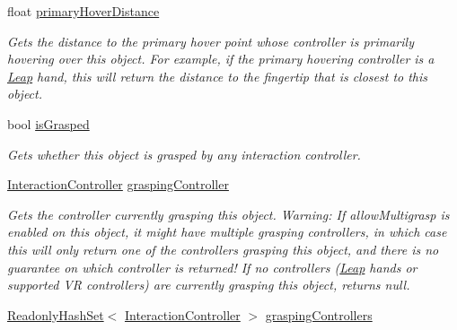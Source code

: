 \begin{DoxyCompactItemize}
float \mbox{\hyperlink{class_leap_1_1_unity_1_1_interaction_1_1_interaction_behaviour_afad478858c7b7f2e5c6cc38bbbaff535}{primary\+Hover\+Distance}}
\begin{DoxyCompactList}\small\item\em Gets the distance to the primary hover point whose controller is primarily hovering over this object. For example, if the primary hovering controller is a \mbox{\hyperlink{namespace_leap_1_1_unity_1_1_leap}{Leap}} hand, this will return the distance to the fingertip that is closest to this object. \end{DoxyCompactList}\item 
bool \mbox{\hyperlink{class_leap_1_1_unity_1_1_interaction_1_1_interaction_behaviour_ad6176dc89403f491f7496e6781be9a8f}{is\+Grasped}}
\begin{DoxyCompactList}\small\item\em Gets whether this object is grasped by any interaction controller. \end{DoxyCompactList}\item 
\mbox{\hyperlink{class_leap_1_1_unity_1_1_interaction_1_1_interaction_controller}{Interaction\+Controller}} \mbox{\hyperlink{class_leap_1_1_unity_1_1_interaction_1_1_interaction_behaviour_a7da6b3f9bc72ed337ccc2136035dd08f}{grasping\+Controller}}
\begin{DoxyCompactList}\small\item\em Gets the controller currently grasping this object. Warning\+: If allow\+Multigrasp is enabled on this object, it might have multiple grasping controllers, in which case this will only return one of the controllers grasping this object, and there is no guarantee on which controller is returned! If no controllers (\mbox{\hyperlink{namespace_leap_1_1_unity_1_1_leap}{Leap}} hands or supported VR controllers) are currently grasping this object, returns null. \end{DoxyCompactList}\item 
\mbox{\hyperlink{struct_leap_1_1_unity_1_1_readonly_hash_set}{Readonly\+Hash\+Set}}$<$ \mbox{\hyperlink{class_leap_1_1_unity_1_1_interaction_1_1_interaction_controller}{Interaction\+Controller}} $>$ \mbox{\hyperlink{class_leap_1_1_unity_1_1_interaction_1_1_interaction_behaviour_a4e52474da012bf38d096cbbacd73b3ec}{grasping\+Controllers}}

\end{DoxyCompactItemize}
